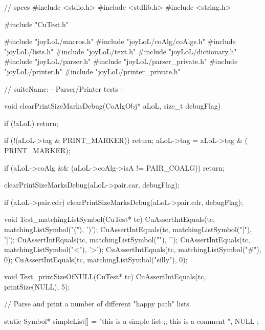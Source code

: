 \starttyping
// specs
#include <stdio.h>
#include <stdlib.h>
#include <string.h>

#include "CuTest.h"

#include "joyLoL/macros.h"
#include "joyLoL/coAlg/coAlgs.h"
#include "joyLoL/lists.h"
#include "joyLoL/text.h"
#include "joyLoL/dictionary.h"
#include "joyLoL/parser.h"
#include "joyLoL/parser_private.h"
#include "joyLoL/printer.h"
#include "joyLoL/printer_private.h"

// suiteName: - Parser/Printer tests -

void clearPrintSizeMarksDebug(CoAlgObj* aLoL, size_t debugFlag) {
  if (!aLoL) return;

  if (!(aLoL->tag & PRINT_MARKER)) return;
  aLoL->tag = aLoL->tag & (~ PRINT_MARKER);

  if (aLoL->coAlg && (aLoL->coAlg->isA != PAIR_COALG)) return;

  clearPrintSizeMarksDebug(aLoL->pair.car, debugFlag);

  if (aLoL->pair.cdr) {
    clearPrintSizeMarksDebug(aLoL->pair.cdr, debugFlag);
  }
}

void Test_matchingListSymbol(CuTest* tc) {
  CuAssertIntEquals(tc, matchingListSymbol("("), ')');
  CuAssertIntEquals(tc, matchingListSymbol("["), ']');
  CuAssertIntEquals(tc, matchingListSymbol("{"), '}');
  CuAssertIntEquals(tc, matchingListSymbol("<"), '>');
  CuAssertIntEquals(tc, matchingListSymbol("#"), 0);
  CuAssertIntEquals(tc, matchingListSymbol("silly"), 0);
}

void Test_printSizeOfNULL(CuTest* tc) {
  CuAssertIntEquals(tc, printSize(NULL), 5);
}

// Parse and print a number of different "happy path" lists

static Symbol* simpleList[] = {
  "this is a simple list ;; this is a comment ",
  NULL
};

